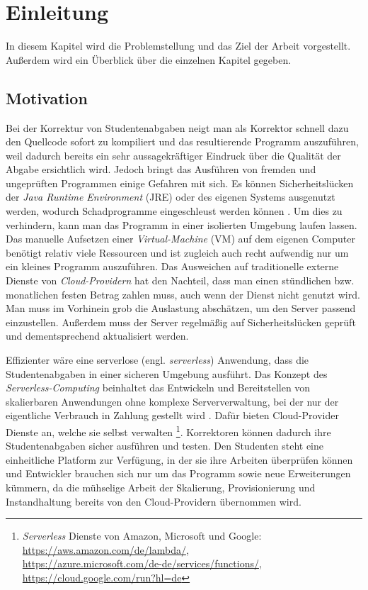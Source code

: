 \chapter{Einleitung}
In diesem Kapitel wird die Problemstellung und das Ziel der Arbeit vorgestellt.
Außerdem wird ein Überblick über die einzelnen Kapitel gegeben.

\section{Motivation}
Bei der Korrektur von Studentenabgaben neigt man als Korrektor schnell dazu den Quellcode sofort 
zu kompiliert und das resultierende Programm auszuführen, 
weil dadurch bereits ein sehr aussagekräftiger Eindruck über die Qualität der Abgabe ersichtlich wird. 
Jedoch bringt das Ausführen von fremden und ungeprüften Programmen einige Gefahren mit sich.
Es können Sicherheitslücken der \textit{Java Runtime Environment} (JRE) \cite{Jre}
oder des eigenen Systems ausgenutzt werden, wodurch Schadprogramme eingeschleust
werden können \cite{CveJreVuln}.
Um dies zu verhindern, kann man das Programm in einer isolierten Umgebung laufen lassen.
Das manuelle Aufsetzen einer \textit{Virtual-Machine} (VM) \cite{RedHatVM} auf dem eigenen Computer
benötigt relativ viele Ressourcen und ist zugleich auch recht aufwendig nur um ein kleines Programm auszuführen.
Das Ausweichen auf traditionelle externe Dienste von \textit{Cloud-Providern} hat den Nachteil,
dass man einen stündlichen bzw. monatlichen festen Betrag zahlen muss,
auch wenn der Dienst nicht genutzt wird. Man muss im Vorhinein grob die Auslastung abschätzen,
um den Server passend einzustellen. Außerdem muss der Server regelmäßig auf
Sicherheitslücken geprüft und dementsprechend aktualisiert werden.

Effizienter wäre eine serverlose (engl. \textit{serverless}) Anwendung, dass die Studentenabgaben in einer sicheren Umgebung ausführt.
Das Konzept des \textit{Serverless-Computing} beinhaltet das Entwickeln und Bereitstellen
von skalierbaren Anwendungen ohne komplexe Serververwaltung, bei der nur der eigentliche Verbrauch
in Zahlung gestellt wird \cite{CioGov}.
Dafür bieten Cloud-Provider Dienste an, welche sie selbst verwalten
\footnote{
  \textit{Serverless} Dienste von Amazon, Microsoft und Google: \\
  {\url{https://aws.amazon.com/de/lambda/}}, \\
  {\url{https://azure.microsoft.com/de-de/services/functions/}}, \\
  {\url{https://cloud.google.com/run?hl=de}}
}.
Korrektoren können dadurch ihre Studentenabgaben sicher ausführen und testen.
Den Studenten steht eine einheitliche Platform zur Verfügung, in der sie ihre Arbeiten überprüfen können und
Entwickler brauchen sich nur um das Programm sowie neue Erweiterungen kümmern, da die mühselige Arbeit
der Skalierung, Provisionierung und Instandhaltung bereits von den Cloud-Providern übernommen wird.

